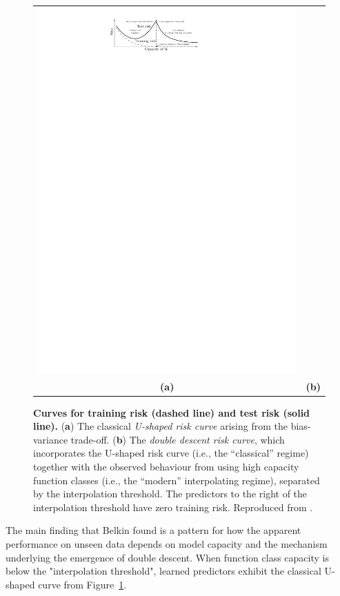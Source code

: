 \begin{figure}[h!]
\begin{tabular}{cc}
    \includegraphics[height=0.15\textheight]{pdf/doubledescent.pdf} \\
    {\bf (a)} & {\bf (b)}
    \end{tabular}
    \caption{{\bf Curves for training risk (dashed line) and test risk (solid line).}
      ({\bf a}) The classical \emph{U-shaped risk curve} arising from the bias-variance trade-off.
      ({\bf b}) The \emph{double descent risk curve}, which incorporates the U-shaped risk curve (i.e., the ``classical'' regime) together with the observed behaviour from using high capacity function classes (i.e., the ``modern'' interpolating regime), separated by the interpolation threshold.
      The predictors to the right of the interpolation threshold have zero training risk. Reproduced from \cite{belkin_reconciling_2019}.}
    \label{fig:double-descent}
  \end{figure}
The main finding that Belkin found is a pattern for how the apparent performance on unseen data depends on model capacity and the mechanism underlying the emergence of double descent. When function class capacity is below the "interpolation threshold", learned predictors exhibit the classical U-shaped curve from Figure~\ref{fig:double-descent}. 
